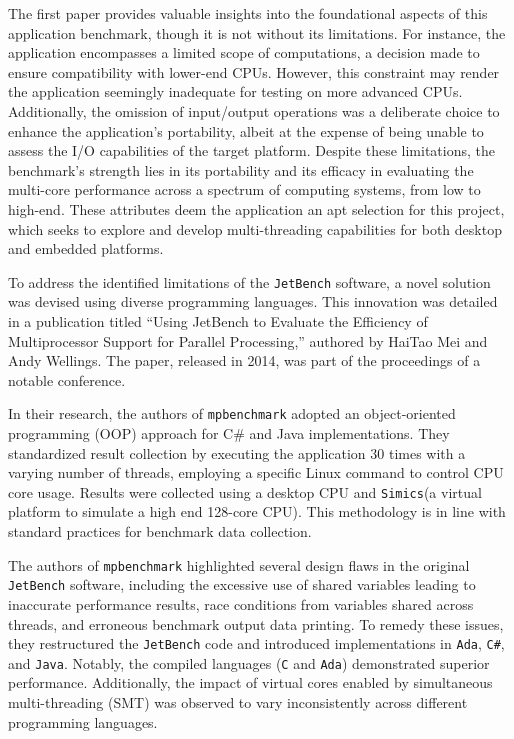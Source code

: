 The first paper\cite{JetBench_paper} provides valuable insights into the foundational aspects of this application benchmark, though it is not without its limitations. For instance, the application encompasses a limited scope of computations, a decision made to ensure compatibility with lower-end CPUs. However, this constraint may render the application seemingly inadequate for testing on more advanced CPUs. Additionally, the omission of input/output operations was a deliberate choice to enhance the application's portability, albeit at the expense of being unable to assess the I/O capabilities of the target platform. Despite these limitations, the benchmark's strength lies in its portability and its efficacy in evaluating the multi-core performance across a spectrum of computing systems, from low to high-end. These attributes deem the application an apt selection for this project, which seeks to explore and develop multi-threading capabilities for both desktop and embedded platforms.

To address the identified limitations of the \texttt{JetBench} software, a novel solution was devised using diverse programming languages. This innovation was detailed in a publication titled ``Using JetBench to Evaluate the Efficiency of Multiprocessor Support for Parallel Processing,'' authored by HaiTao Mei and Andy Wellings. The paper, released in 2014, was part of the proceedings of a notable conference\cite{mpbenchmark_paper}.

In their research, the authors of \texttt{mpbenchmark}\cite{mpbenchmark_paper} adopted an object-oriented programming (OOP) approach for C\# and Java implementations. They standardized result collection by executing the application 30 times with a varying number of threads, employing a specific Linux command to control CPU core usage. Results were collected using a desktop CPU and \texttt{Simics}(a virtual platform to simulate a high end 128-core CPU).  This methodology is in line with standard practices for benchmark data collection.

The authors of \texttt{mpbenchmark}\cite{mpbenchmark_paper} highlighted several design flaws in the original \texttt{JetBench} software\cite{JetBench_paper}, including the excessive use of shared variables leading to inaccurate performance results, race conditions from variables shared across threads, and erroneous benchmark output data printing. To remedy these issues, they restructured the \texttt{JetBench} code and introduced implementations in \texttt{Ada}, \texttt{C\#}, and \texttt{Java}. Notably, the compiled languages (\texttt{C} and \texttt{Ada}) demonstrated superior performance. Additionally, the impact of virtual cores enabled by simultaneous multi-threading (SMT) was observed to vary inconsistently across different programming languages.

